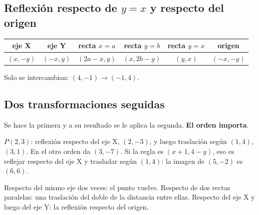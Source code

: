 \subsection{\texorpdfstring{Reflexión respecto de $y = x$ y respecto del origen}{Reflexión respecto de y = x y respecto del origen}}
\begin{center}\small
\begin{tabular}{cccccc}\toprule
eje X & eje Y & recta $x = a$ & recta $y = b$ & recta $y = x$ & origen\\\midrule
$(x, -y)$ & $(-x, y)$ & $(2a - x, y)$ & $(x, 2b - y)$ & $(y, x)$ & $(-x, -y)$\\\bottomrule
\end{tabular}\end{center}
\begin{ojo}[Con $y = x$ no cambian los signos] Solo se intercambian: $(4, -1) \to (-1, 4)$.\end{ojo}

\subsection{Dos transformaciones seguidas}
Se hace la primera y a su resultado se le aplica la segunda. \textbf{El orden importa}.
\begin{ejemplo} $P(2, 3)$: reflexión respecto del eje X, $(2, -3)$, y luego traslación según $(1, 4)$, $(3, 1)$. En el otro orden da $(3, -7)$. Si la regla es $(x + 1, 4 - y)$, eso es reflejar respecto del eje X y trasladar según $(1, 4)$: la imagen de $(5, -2)$ es $(6, 6)$.\end{ejemplo}
\begin{clave} Respecto del mismo eje dos veces: el punto vuelve. Respecto de dos rectas paralelas: una traslación del doble de la distancia entre ellas. Respecto del eje X y luego del eje Y: la reflexión respecto del origen.\end{clave}

